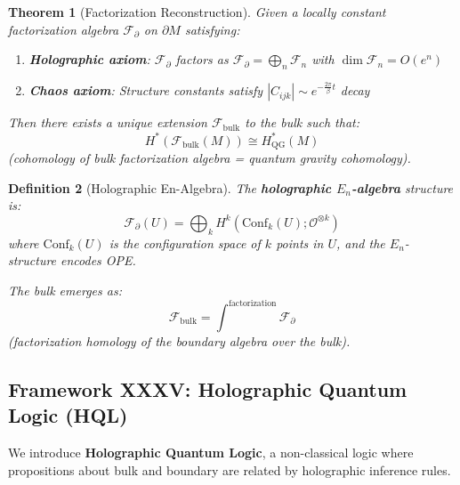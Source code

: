 \documentclass[12pt,a4paper]{article}
\newtheorem{theorem}{Theorem}[section]
\newtheorem{definition}[theorem]{Definition}
\begin{document}
\begin{theorem}[Factorization Reconstruction]\label{thm:fact-reconstruction}
Given a locally constant factorization algebra $\mathcal{F}_{\partial}$ on $\partial M$ satisfying:
\begin{enumerate}
    \item \textbf{Holographic axiom}: $\mathcal{F}_{\partial}$ factors as $\mathcal{F}_{\partial} = \bigoplus_{n} \mathcal{F}_n$ with $\dim \mathcal{F}_n = O(e^{n})$
    \item \textbf{Chaos axiom}: Structure constants satisfy $|C_{ijk}| \sim e^{-\frac{2\pi}{\beta}t}$ decay
\end{enumerate}

Then there exists a unique extension $\mathcal{F}_{\text{bulk}}$ to the bulk such that:
\begin{equation}
H^*(\mathcal{F}_{\text{bulk}}(M)) \cong H^*_{\text{QG}}(M)
\end{equation}
(cohomology of bulk factorization algebra = quantum gravity cohomology).
\end{theorem}

\begin{definition}[Holographic En-Algebra]\label{def:holo-en}
The \textbf{holographic $E_n$-algebra} structure is:
\begin{equation}
\mathcal{F}_{\partial}(U) = \bigoplus_{k} H^k(\text{Conf}_k(U); \mathcal{O}^{\otimes k})
\end{equation}
where $\text{Conf}_k(U)$ is the configuration space of $k$ points in $U$, and the $E_n$-structure encodes OPE.

The bulk emerges as:
\begin{equation}
\mathcal{F}_{\text{bulk}} = \int^{\text{factorization}} \mathcal{F}_{\partial}
\end{equation}
(factorization homology of the boundary algebra over the bulk).
\end{definition}

\subsection{Framework XXXV: Holographic Quantum Logic (HQL)}
\label{subsec:holographic-quantum-logic}

We introduce \textbf{Holographic Quantum Logic}, a non-classical logic where propositions about bulk and boundary are related by holographic inference rules.
\end{document}
